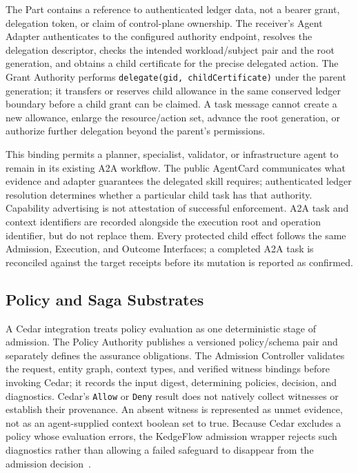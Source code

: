 The Part contains a reference to authenticated ledger data, not a bearer grant, delegation token, or claim of control-plane ownership. The receiver's Agent Adapter authenticates to the configured authority endpoint, resolves the delegation descriptor, checks the intended workload/subject pair and the root generation, and obtains a child certificate for the precise delegated action. The Grant Authority performs \texttt{delegate(gid, childCertificate)} under the parent generation; it transfers or reserves child allowance in the same conserved ledger boundary before a child grant can be claimed. A task message cannot create a new allowance, enlarge the resource/action set, advance the root generation, or authorize further delegation beyond the parent's permissions.

This binding permits a planner, specialist, validator, or infrastructure agent to remain in its existing A2A workflow. The public AgentCard communicates what evidence and adapter guarantees the delegated skill requires; authenticated ledger resolution determines whether a particular child task has that authority. Capability advertising is not attestation of successful enforcement. A2A task and context identifiers are recorded alongside the execution root and operation identifier, but do not replace them. Every protected child effect follows the same Admission, Execution, and Outcome Interfaces; a completed A2A task is reconciled against the target receipts before its mutation is reported as confirmed.

\subsection{Policy and Saga Substrates}
\label{sec:policy-saga-substrates}

A Cedar integration treats policy evaluation as one deterministic stage of admission. The Policy Authority publishes a versioned policy/schema pair and separately defines the assurance obligations. The Admission Controller validates the request, entity graph, context types, and verified witness bindings before invoking Cedar; it records the input digest, determining policies, decision, and diagnostics. Cedar's \texttt{Allow} or \texttt{Deny} result does not natively collect witnesses or establish their provenance. An absent witness is represented as unmet evidence, not as an agent-supplied context boolean set to true. Because Cedar excludes a policy whose evaluation errors, the KedgeFlow admission wrapper rejects such diagnostics rather than allowing a failed safeguard to disappear from the admission decision~\cite{cedarauth2026,cedarvalidation2026}.

